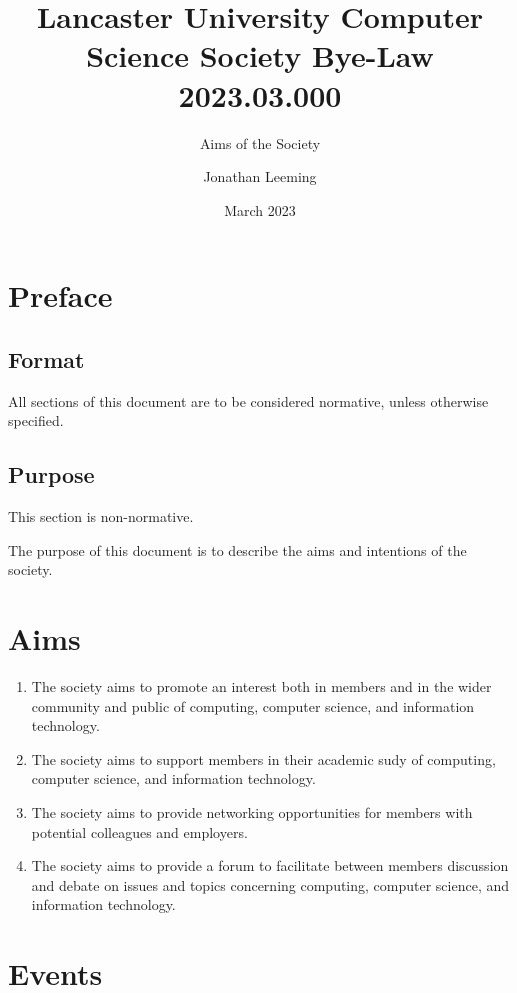 \documentclass{scrartcl}
\title{Lancaster University Computer Science Society Bye-Law 2023.03.000}
\subtitle{Aims of the Society}
\author{Jonathan Leeming}
\date{March 2023}
\begin{document}
    \maketitle
    
    \clearpage
    \tableofcontents

    \clearpage
    \section{Preface}
        \label{preface}
        \subsection{Format}
            \label{preface--format}
            All sections of this document are to be considered normative, unless otherwise specified.

        \subsection{Purpose}
            \label{preface--purpose}
            This section is non-normative.

            The purpose of this document is to describe the aims and intentions of the society.

    \clearpage
    \section{Aims}
        \label{aims}
        \begin{enumerate}
            \item The society aims to promote an interest both in members and in the wider community and public of computing, computer science, and information technology.
            \item The society aims to support members in their academic sudy of computing, computer science, and information technology.
            \item The society aims to provide networking opportunities for members with potential colleagues and employers.
            \item The society aims to provide a forum to facilitate between members discussion and debate on issues and topics concerning computing, computer science, and information technology.
        \end{enumerate}

    \clearpage
    \section{Events}
        \label{events}
\end{document}
